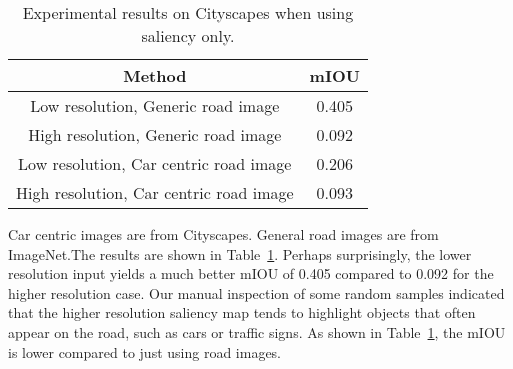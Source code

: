 \documentclass[10pt,twocolumn,letterpaper]{article}
\begin{document}
\begin{table}
\begin{center}
\caption{Experimental results on Cityscapes when using saliency only.}
\begin{tabular}{cc}
\hline
Method & mIOU \\
\hline
Low resolution, Generic road image & 0.405 \\
High resolution, Generic road image & 0.092 \\
Low resolution, Car centric road image & 0.206 \\
High resolution, Car centric road image & 0.093 \\
\hline
\end{tabular}
\end{center}
\label{Tab:experiment}
\end{table}
Car centric images are from Cityscapes. General road images
are from ImageNet.The results are shown in Table~\ref{Tab:experiment}. Perhaps surprisingly, the lower resolution input yields a much better
mIOU of 0.405 compared to 0.092 for the higher resolution
case. Our manual inspection of some random samples
indicated that the higher resolution saliency map tends to
highlight objects that often appear on the road, such as cars
or traffic signs. As shown in Table~\ref{Tab:experiment}, the mIOU is lower compared to just using road images.


\end{document}
